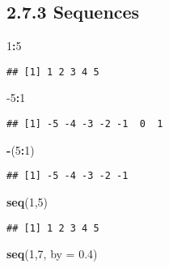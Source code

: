 \documentclass[]{article}
\newenvironment{Shaded}{\begin{snugshade}}{\end{snugshade}}
\newcommand{\DataTypeTok}[1]{\textcolor[rgb]{0.13,0.29,0.53}{#1}}
\newcommand{\DecValTok}[1]{\textcolor[rgb]{0.00,0.00,0.81}{#1}}
\newcommand{\FloatTok}[1]{\textcolor[rgb]{0.00,0.00,0.81}{#1}}
\newcommand{\KeywordTok}[1]{\textcolor[rgb]{0.13,0.29,0.53}{\textbf{#1}}}
\newcommand{\NormalTok}[1]{#1}
\newcommand{\OperatorTok}[1]{\textcolor[rgb]{0.81,0.36,0.00}{\textbf{#1}}}
\begin{document}
\hypertarget{sequences}{%
\subsection{2.7.3 Sequences}\label{sequences}}

\begin{Shaded}
\begin{Highlighting}[]
\DecValTok{1}\OperatorTok{:}\DecValTok{5}
\end{Highlighting}
\end{Shaded}

\begin{verbatim}
## [1] 1 2 3 4 5
\end{verbatim}

\begin{Shaded}
\begin{Highlighting}[]
\DecValTok{-5}\OperatorTok{:}\DecValTok{1}
\end{Highlighting}
\end{Shaded}

\begin{verbatim}
## [1] -5 -4 -3 -2 -1  0  1
\end{verbatim}

\begin{Shaded}
\begin{Highlighting}[]
\OperatorTok{-}\NormalTok{(}\DecValTok{5}\OperatorTok{:}\DecValTok{1}\NormalTok{)}
\end{Highlighting}
\end{Shaded}

\begin{verbatim}
## [1] -5 -4 -3 -2 -1
\end{verbatim}

\begin{Shaded}
\begin{Highlighting}[]
\KeywordTok{seq}\NormalTok{(}\DecValTok{1}\NormalTok{,}\DecValTok{5}\NormalTok{)}
\end{Highlighting}
\end{Shaded}

\begin{verbatim}
## [1] 1 2 3 4 5
\end{verbatim}

\begin{Shaded}
\begin{Highlighting}[]
\KeywordTok{seq}\NormalTok{(}\DecValTok{1}\NormalTok{,}\DecValTok{7}\NormalTok{, }\DataTypeTok{by =} \FloatTok{0.4}\NormalTok{)}
\end{Highlighting}
\end{Shaded}
\end{document}
